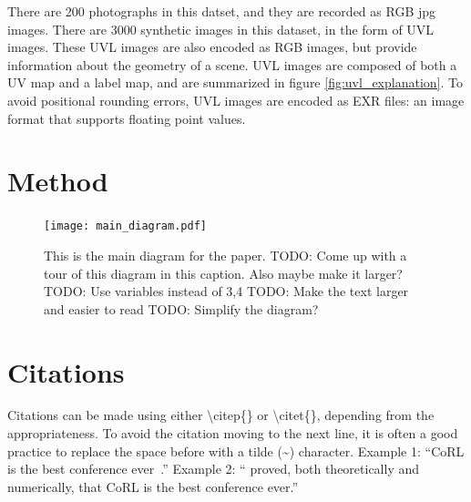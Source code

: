 \documentclass{article}
\begin{document}
There are 200 photographs in this datset, and they are recorded as RGB jpg images.
There are 3000 synthetic images in this dataset, in the form of UVL images.
These UVL images are also encoded as RGB images, but provide information about the geometry of a scene.
UVL images are composed of both a UV map and a label map, and are summarized in figure \ref{fig:uvl_explanation}.
To avoid positional rounding errors, UVL images are encoded as EXR files: an image format that supports floating point values.


\section{Method}
\label{sec:text}

\begin{figure}[H]
	\begin{center}
		\texttt{[image: main\_diagram.pdf]}
	\end{center}
	\caption{
		This is the main diagram for the paper.
		TODO: Come up with a tour of this diagram in this caption. Also maybe make it larger?
		TODO: Use variables instead of 3,4 
		TODO: Make the text larger and easier to read
		TODO: Simplify the diagram?
		}
	\label{fig:main_diagram}
\end{figure}
	



\section{Citations}
\label{sec:citations}

	Citations can be made using either \textbackslash citep\{\} or \textbackslash citet\{\}, depending from the appropriateness. To avoid the citation moving to the next line, it is often a good practice to replace the space before with a tilde (\~{}) character.
	Example 1: ``CoRL is the best conference ever~\citep{Gauss1857}.''
	Example 2: ``\citet{Gauss1857} proved, both theoretically and numerically, that CoRL is the best conference ever.''
	

\clearpage
\acknowledgments{}


\end{document}
